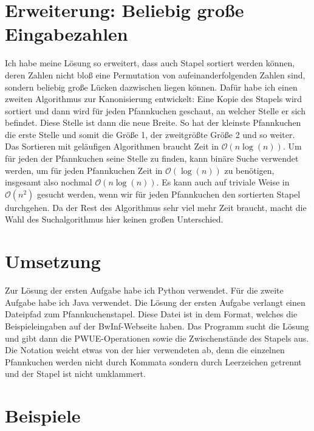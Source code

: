 \documentclass[a4paper,10pt,ngerman]{scrartcl}
\begin{document}
\section{Erweiterung: Beliebig große Eingabezahlen}
Ich habe meine Lösung so erweitert, dass auch Stapel sortiert werden können, deren Zahlen nicht bloß eine Permutation von aufeinanderfolgenden Zahlen sind, sondern beliebig große
Lücken dazwischen liegen können. Dafür habe ich einen zweiten Algorithmus zur Kanonisierung entwickelt: Eine Kopie des Stapels wird sortiert und dann wird für jeden Pfannkuchen
geschaut, an welcher Stelle er sich befindet. Diese Stelle ist dann die neue Breite. So hat der kleinste Pfannkuchen die erste Stelle und somit die Größe 1, der zweitgrößte Größe 2 
und so weiter. Das Sortieren mit geläufigen Algorithmen braucht Zeit in $\mathcal{O}(n \log(n))$. Um für jeden der Pfannkuchen seine Stelle zu finden, kann binäre Suche verwendet werden,
um für jeden Pfannkuchen Zeit in $\mathcal{O}(\log(n))$ zu benötigen, insgesamt also nochmal $\mathcal{O}(n \log(n))$. Es kann auch auf triviale Weise in $\mathcal{O}(n^2)$ gesucht werden,
wenn wir für jeden Pfannkuchen den sortierten Stapel durchgehen. Da der Rest des Algorithmus sehr viel mehr Zeit braucht, macht die Wahl des Suchalgorithmus hier keinen großen Unterschied.
\section{Umsetzung}
Zur Lösung der ersten Aufgabe habe ich Python verwendet. Für die zweite Aufgabe
habe ich Java verwendet. Die Lösung der ersten Aufgabe verlangt einen Dateipfad
zum Pfannkuchenstapel. Diese Datei ist in dem Format, welches die
Beispieleingaben auf der BwInf-Webseite haben. Das Programm sucht die Lösung
und gibt dann die PWUE-Operationen sowie die Zwischenstände des Stapels aus.
Die Notation weicht etwas von der hier verwendeten ab, denn die einzelnen
Pfannkuchen werden nicht durch Kommata sondern durch Leerzeichen getrennt und
der Stapel ist nicht umklammert.
\section{Beispiele}
\end{document}
